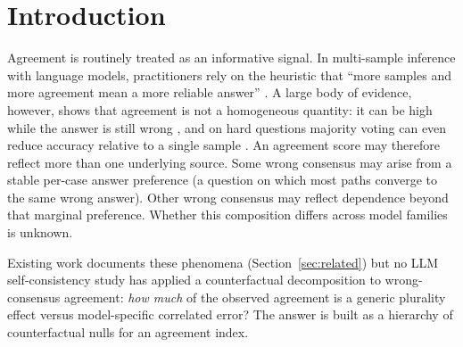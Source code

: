 \documentclass{article}
\begin{document}

\section{Introduction}
\label{sec:intro}

Agreement is routinely treated as an informative signal. In multi-sample
inference with language models, practitioners rely on the heuristic that
``more samples and more agreement mean a more reliable answer''
\cite{wang2022selfconsistency}. A large
body of evidence, however, shows that agreement is not a homogeneous
quantity: it
can be high while the answer is still wrong \cite{ding2026auditing}, and on hard questions majority voting can even reduce
accuracy relative to a single sample \cite{bahuguna2026when}. An
agreement score may therefore reflect more than one underlying source.
Some wrong consensus may arise from a stable per-case answer preference
(a question on which most paths converge to the same wrong answer).
Other wrong consensus may reflect dependence beyond that marginal
preference. Whether this composition differs across model families is
unknown.

Existing work documents these phenomena (Section~\ref{sec:related}) but no LLM self-consistency study has applied a counterfactual decomposition to wrong-consensus agreement:
\emph{how much} of
the observed agreement is a generic
plurality effect versus model-specific correlated error? The answer is built as a hierarchy of counterfactual nulls for an agreement index.
\end{document}
